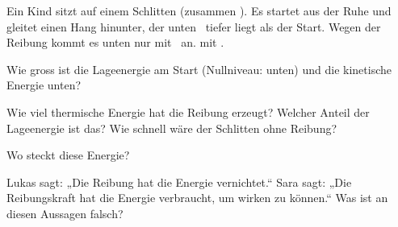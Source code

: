 Ein Kind sitzt auf einem Schlitten (zusammen \mSO). Es startet aus der Ruhe und gleitet einen Hang hinunter, der unten \hSO\ tiefer liegt als der Start. Wegen der Reibung kommt es unten nur mit \vSO\ an.  mit \gO.

\begin{abcliste}
\abc
Wie gross ist die Lageenergie am Start (Nullniveau: unten) und die kinetische Energie unten?

\abc
Wie viel thermische Energie hat die Reibung erzeugt? Welcher Anteil der Lageenergie ist das? Wie schnell wäre der Schlitten ohne Reibung?

\abc
Wo steckt diese Energie?

\abc
Lukas sagt: „Die Reibung hat die Energie vernichtet.“ Sara sagt: „Die Reibungskraft hat die Energie verbraucht, um wirken zu können.“ Was ist an diesen Aussagen falsch?
\end{abcliste}

